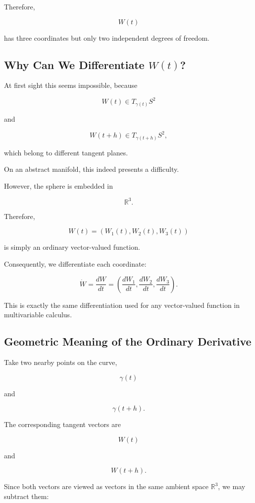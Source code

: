 \documentclass[12pt,a4paper]{article}
\theoremstyle{notespace}
\begin{document}
Therefore,

\[
W(t)
\]

has three coordinates but only two independent degrees of freedom.


\subsection{Why Can We Differentiate \(W(t)\)?}

At first sight this seems impossible, because

\[
W(t)
\in
T_{\gamma(t)}S^2
\]

and

\[
W(t+h)
\in
T_{\gamma(t+h)}S^2,
\]

which belong to different tangent planes.

On an abstract manifold, this indeed presents a difficulty.

However, the sphere is embedded in

\[
\mathbb R^3.
\]

Therefore,

\[
W(t)
=
(W_1(t),W_2(t),W_3(t))
\]

is simply an ordinary vector-valued function.

Consequently, we differentiate each coordinate:

\[
\boxed{
	\dot W
	=
	\frac{dW}{dt}
	=
	\left(
	\frac{dW_1}{dt},
	\frac{dW_2}{dt},
	\frac{dW_3}{dt}
	\right).
}
\]

This is exactly the same differentiation used for any vector-valued
function in multivariable calculus.


\subsection{Geometric Meaning of the Ordinary Derivative}

Take two nearby points on the curve,

\[
\gamma(t)
\]

and

\[
\gamma(t+h).
\]

The corresponding tangent vectors are

\[
W(t)
\]

and

\[
W(t+h).
\]

Since both vectors are viewed as vectors in the same ambient space
\(\mathbb R^3\), we may subtract them:
\end{document}
